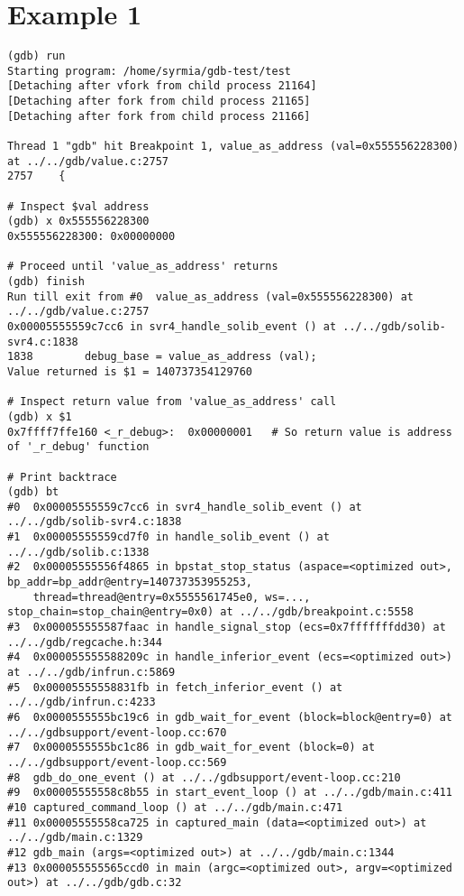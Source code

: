 \documentclass{report}
\begin{document}
\section *{Example 1}
\begin{verbatim}
(gdb) run
Starting program: /home/syrmia/gdb-test/test 
[Detaching after vfork from child process 21164]
[Detaching after fork from child process 21165]
[Detaching after fork from child process 21166]

Thread 1 "gdb" hit Breakpoint 1, value_as_address (val=0x555556228300) at ../../gdb/value.c:2757
2757	{

# Inspect $val address 
(gdb) x 0x555556228300
0x555556228300:	0x00000000

# Proceed until 'value_as_address' returns
(gdb) finish
Run till exit from #0  value_as_address (val=0x555556228300) at ../../gdb/value.c:2757
0x00005555559c7cc6 in svr4_handle_solib_event () at ../../gdb/solib-svr4.c:1838
1838	    debug_base = value_as_address (val);
Value returned is $1 = 140737354129760

# Inspect return value from 'value_as_address' call
(gdb) x $1
0x7ffff7ffe160 <_r_debug>:	0x00000001   # So return value is address of '_r_debug' function

# Print backtrace
(gdb) bt
#0  0x00005555559c7cc6 in svr4_handle_solib_event () at ../../gdb/solib-svr4.c:1838
#1  0x00005555559cd7f0 in handle_solib_event () at ../../gdb/solib.c:1338
#2  0x00005555556f4865 in bpstat_stop_status (aspace=<optimized out>, bp_addr=bp_addr@entry=140737353955253, 
    thread=thread@entry=0x5555561745e0, ws=..., stop_chain=stop_chain@entry=0x0) at ../../gdb/breakpoint.c:5558
#3  0x000055555587faac in handle_signal_stop (ecs=0x7fffffffdd30) at ../../gdb/regcache.h:344
#4  0x000055555588209c in handle_inferior_event (ecs=<optimized out>) at ../../gdb/infrun.c:5869
#5  0x00005555558831fb in fetch_inferior_event () at ../../gdb/infrun.c:4233
#6  0x0000555555bc19c6 in gdb_wait_for_event (block=block@entry=0) at ../../gdbsupport/event-loop.cc:670
#7  0x0000555555bc1c86 in gdb_wait_for_event (block=0) at ../../gdbsupport/event-loop.cc:569
#8  gdb_do_one_event () at ../../gdbsupport/event-loop.cc:210
#9  0x00005555558c8b55 in start_event_loop () at ../../gdb/main.c:411
#10 captured_command_loop () at ../../gdb/main.c:471
#11 0x00005555558ca725 in captured_main (data=<optimized out>) at ../../gdb/main.c:1329
#12 gdb_main (args=<optimized out>) at ../../gdb/main.c:1344
#13 0x000055555565ccd0 in main (argc=<optimized out>, argv=<optimized out>) at ../../gdb/gdb.c:32


\end{verbatim}
\end{document}
